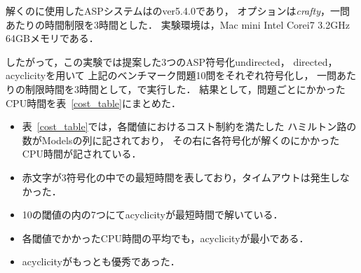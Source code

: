 解くのに使用したASPシステムは{\clingo}のver5.4.0であり，
オプションは\textit{crafty}，一問あたりの時間制限を3時間とした．
実験環境は，Mac mini Intel Corei7 3.2GHz 64GBメモリである．

したがって，この実験では提案した3つのASP符号化\textsf{undirected}，
\textsf{directed}，\textsf{acyclicity}を用いて
上記のベンチマーク問題10問をそれぞれ符号化し，
一問あたりの制限時間を3時間として，{\clingo}で実行した．
結果として，問題ごとにかかったCPU時間を表~\ref{cost_table}にまとめた．

\begin{itemize}
\item 表~\ref{cost_table}では，各閾値におけるコスト制約を満たした
  ハミルトン路の数がModelsの列に記されており，
  その右に各符号化が解くのにかかったCPU時間が記されている．
\item 赤文字が3符号化の中での最短時間を表しており，タイムアウトは発生しなかった．
\item 10の閾値の内の7つにて\textsf{acyclicity}が最短時間で解いている．
\item 各閾値でかかったCPU時間の平均でも，\textsf{acyclicity}が最小である．
\item \textsf{acyclicity}がもっとも優秀であった．
\end{itemize}

